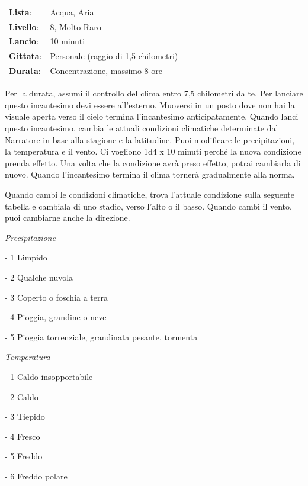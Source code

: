 \begin{multicols}{2}
\noindent\begin{tabularx}{\linewidth}{p{1.3cm}X}
	\rowcolor{gray!20}\textbf{Lista}: & Acqua, Aria \\
	\textbf{Livello}: & 8, Molto Raro \\
	\rowcolor{gray!20}\textbf{Lancio}: & 10 minuti \\
	\textbf{Gittata}: & Personale (raggio di 1,5 chilometri) \\
	\rowcolor{gray!20}\textbf{Durata}: & Concentrazione, massimo 8 ore \\
\end{tabularx}\smallskip

Per la durata, assumi il controllo del clima entro 7,5 chilometri da te. Per lanciare questo incantesimo devi essere all'esterno. Muoversi in un posto dove non hai la visuale aperta verso il cielo termina l'incantesimo anticipatamente. Quando lanci questo incantesimo, cambia le attuali condizioni climatiche determinate dal Narratore in base alla stagione e la latitudine. Puoi modificare le precipitazioni, la temperatura e il vento. Ci vogliono 1d4 x 10 minuti perché la nuova condizione prenda effetto. Una volta che la condizione avrà preso effetto, potrai cambiarla di nuovo. Quando l'incantesimo termina il clima tornerà gradualmente alla norma.

\medskip

Quando cambi le condizioni climatiche, trova l'attuale condizione sulla seguente tabella e cambiala di uno stadio, verso l'alto o il basso. Quando cambi il vento, puoi cambiarne anche la direzione.

\medskip

\emph{Precipitazione}

- 1 Limpido

- 2 Qualche nuvola

- 3 Coperto o foschia a terra

- 4 Pioggia, grandine o neve

- 5 Pioggia torrenziale, grandinata pesante, tormenta

\medskip

\emph{Temperatura}

- 1 Caldo insopportabile

- 2 Caldo

- 3 Tiepido

- 4 Fresco

- 5 Freddo

- 6 Freddo polare


\end{multicols}
